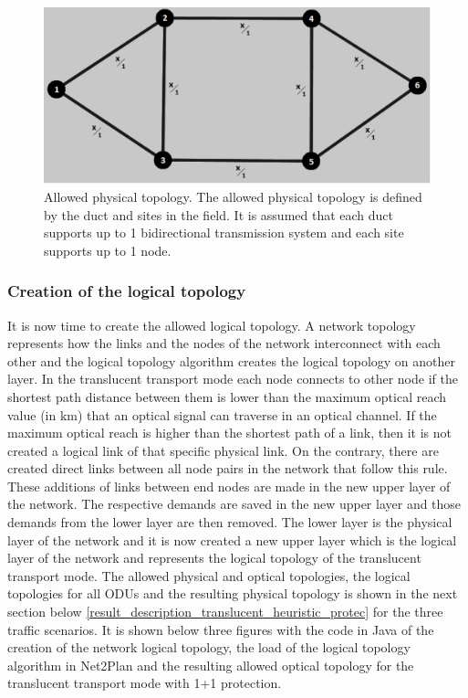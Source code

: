 \begin{figure}[H]
\centering
\includegraphics[width=13cm]{sdf/heuristic/translucent_protection/figures/allowed_physical}
\caption{Allowed physical topology. The allowed physical topology is defined by the duct and sites in the field. It is assumed that each duct supports up to 1 bidirectional transmission system and each site supports up to 1 node.}
\label{allowed_physical_protec}
\end{figure}

\subsubsection{Creation of the logical topology}

\vspace{11pt}
It is now time to create the allowed logical topology. A network topology represents how the links and the nodes of the network interconnect with each other and the logical topology algorithm creates the logical topology on another layer. In the translucent transport mode each node connects to other node if the shortest path distance between them is lower than the maximum optical reach value (in km) that an optical signal can traverse in an optical channel. If the maximum optical reach is higher than the shortest path of a link, then it is not created a logical link of that specific physical link. On the contrary, there are created direct links between all node pairs in the network that follow this rule. These additions of links between end nodes are made in the new upper layer of the network. The respective demands are saved in the new upper layer and those demands from the lower layer are then removed. The lower layer is the physical layer of the network and it is now created a new upper layer which is the logical layer of the network and represents the logical topology of the translucent transport mode.
The allowed physical and optical topologies, the logical topologies for all ODUs and the resulting physical topology is shown in the next section below \ref{result_description_translucent_heuristic_protec} for the three traffic scenarios. It is shown below three figures with the code in Java of the creation of the network logical topology, the load of the logical topology algorithm in Net2Plan and the resulting allowed optical topology for the translucent transport mode with 1+1 protection.

